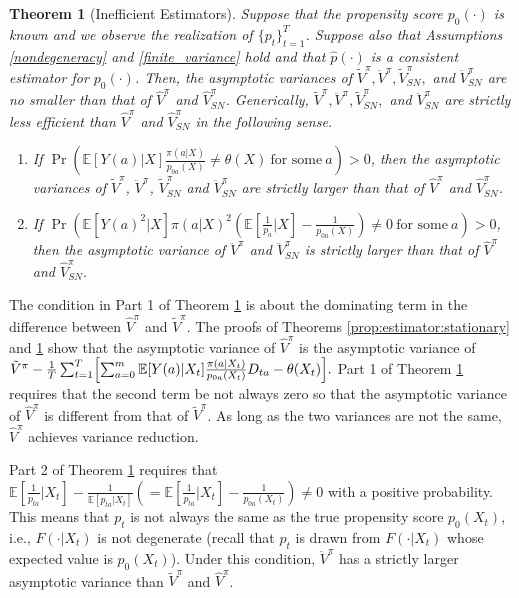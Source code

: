 \documentclass[letterpaper]{article} \usepackage{aaai19}  \usepackage{times}  \usepackage{helvet}  \usepackage{courier}  \usepackage{url}  \usepackage{graphicx}  \frenchspacing  \usepackage{comment}
\newtheorem{theorem}{Theorem}
\begin{document}
\begin{theorem}[Inefficient Estimators]\label{prop:true_pscore:stationary}
	Suppose that the propensity score $p_0(\cdot)$ is known and we observe the realization of $\{p_t\}_{t=1}^T$.
	Suppose also that Assumptions \ref{nondegeneracy} and \ref{finite_variance} hold and that $\hat p(\cdot)$ is a consistent estimator for $p_0(\cdot)$.
	Then, the asymptotic variances of $\tilde V^{\pi}, \ddot V^{\pi}, \tilde V^{\pi}_{SN},$ and $\ddot V^{\pi}_{SN}$ are no smaller than that of $\hat V^{\pi}$ and $\hat V^{\pi}_{SN}$. 
	Generically, $\tilde V^{\pi}, \ddot V^{\pi}, \tilde V^{\pi}_{SN},$ and $\ddot V^{\pi}_{SN}$ are strictly less efficient than $\hat V^{\pi}$ and $\hat V^{\pi}_{SN}$ in the following sense.
	\begin{enumerate}
	\item If $\Pr(\mathbb{E}[Y(a)|X]\frac{\pi(a|X)}{p_{0a}(X)}\neq \theta(X)~\text{for some}~ a)>0$, then the asymptotic variances of $\tilde V^{\pi}$, $\ddot V^{\pi}$, $\tilde V^{\pi}_{SN}$ and $\ddot V^{\pi}_{SN}$ are strictly larger than that of $\hat V^{\pi}$ and $\hat V^{\pi}_{SN}$.
	\item If $\Pr(\mathbb{E}[Y(a)^2|X]\pi(a|X)^2(\mathbb{E}[\frac{1}{p_a}|X]-\frac{1}{p_{0a}(X)})\neq 0~\text{for some}~ a)>0$, then the asymptotic variance of $\ddot V^{\pi}$ and $\ddot V^{\pi}_{SN}$ is strictly larger than that of $\hat V^{\pi}$ and $\hat V^{\pi}_{SN}$.
	\end{enumerate}
\end{theorem}

\noindent The condition in Part 1 of Theorem \ref{prop:true_pscore:stationary} is about the dominating term in the difference between $\hat V^\pi$ and $\tilde V^\pi$.
The proofs of Theorems \ref{prop:estimator:stationary} and \ref{prop:true_pscore:stationary} show that the asymptotic variance of $\hat V^{\pi}$ is the asymptotic variance of
$
	\tilde{V}^\pi-\frac{1}{T}\sum_{t=1}^T \Bigl[\sum_{a=0}^m \mathbb{E}[Y(a)|X_t]\frac{\pi(a|X_t)}{p_{0a}(X_t)}D_{ta}-\theta(X_t)\Bigr].
$
Part 1 of Theorem \ref{prop:true_pscore:stationary} requires that the second term be not always zero so that the asymptotic variance of $\hat V^{\pi}$ is different from that of $\tilde V^{\pi}$. As long as the two variances are not the same, $\hat V^{\pi}$ achieves variance reduction.

Part 2 of Theorem \ref{prop:true_pscore:stationary} requires that $\mathbb{E}[\frac{1}{p_{ta}}|X_t]-\frac{1}{\mathbb{E}[p_{ta}|X_t]}(=\mathbb{E}[\frac{1}{p_{ta}}|X_t]-\frac{1}{p_{0a}(X_t)})\neq 0$ with a positive probability.
This means that $p_t$ is not always the same as the true propensity score $p_{0}(X_t)$, i.e., $F(\cdot|X_t)$ is not degenerate (recall that $p_t$ is drawn from $F(\cdot|X_t)$ whose expected value is $p_0(X_t)$).
Under this condition, $\ddot{V}^\pi$ has a strictly larger asymptotic variance than $\tilde{V}^\pi$ and $\hat{V}^\pi$.
\end{document}
